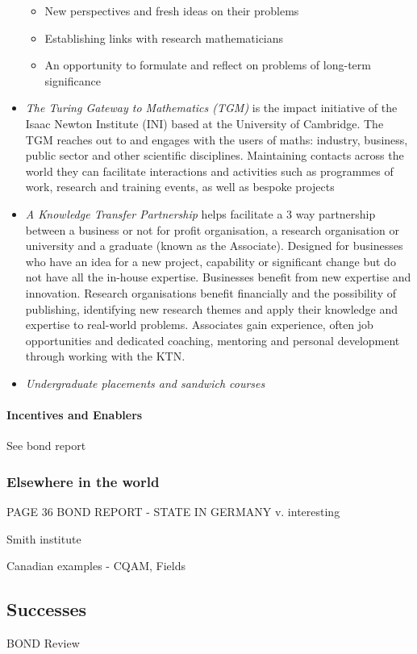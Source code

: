\documentclass[11pt]{article} %
\begin{document}
\begin{itemize}
\begin{itemize}
			\item New perspectives and fresh ideas on their problems
			\item Establishing links with research mathematicians
			\item An opportunity to formulate and reflect on problems  of long-term significance
		\end{itemize}	
		\item \textit{The Turing Gateway to Mathematics (TGM)} is the impact initiative of the Isaac Newton Institute (INI) based at the University of Cambridge. The TGM reaches out to and engages with the users of maths: industry, business, public sector and other scientific disciplines. Maintaining contacts across the world they can facilitate interactions and activities such as programmes of work, research and training events, as well as bespoke projects
		\item  \textit{A Knowledge Transfer Partnership} helps facilitate a 3 way partnership between a business or not for profit organisation, a research organisation or university and a graduate (known as the Associate). Designed for businesses who have an idea for a new project, capability or significant change but  do not have all the in-house expertise. Businesses benefit from new expertise and innovation. Research organisations benefit financially and  the possibility of publishing, identifying new research themes and apply their knowledge and expertise to real-world problems. Associates gain experience, often job opportunities and dedicated coaching, mentoring and personal development through working with the KTN.
		\item \textit{Undergraduate placements and sandwich courses} 
		
	
	\end{itemize}

\paragraph{Incentives and Enablers} 
		See bond report 
		
	\subsubsection{Elsewhere in the world }	
PAGE 36 BOND REPORT - STATE IN GERMANY v. interesting 
		

	Smith institute
	
	Canadian examples - CQAM, Fields 
	
	\subsection{Successes}
	BOND Review 
	
\end{document}
